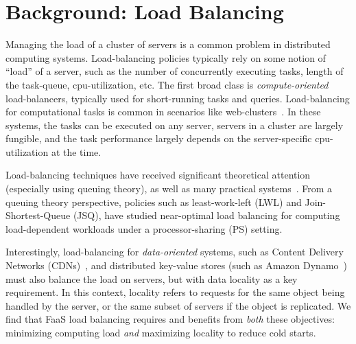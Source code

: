 \section{Background: Load Balancing}

Managing the load of a cluster of servers is a common problem in distributed computing systems.
Load-balancing policies typically rely on some notion of ``load'' of a server, such as the number of concurrently executing tasks, length of the task-queue, cpu-utilization, etc.
%
The first broad class is \emph{compute-oriented} load-balancers, typically used for short-running tasks and queries. 
Load-balancing for computational tasks is common in scenarios like web-clusters~\cite{karger1999web}. 
In these systems, the tasks can be executed on any server,  servers in a cluster are largely fungible, and the task performance largely depends on the server-specific cpu-utilization at the time.

Load-balancing techniques have received significant theoretical attention (especially using queuing theory), as well as many practical systems~\cite{decandia2007dynamo}. 
From a queuing theory perspective, policies such as least-work-left (LWL) and Join-Shortest-Queue (JSQ), have studied near-optimal load balancing for computing load-dependent workloads under a processor-sharing (PS) setting. 

Interestingly, load-balancing for \emph{data-oriented} systems, such as Content Delivery Networks (CDNs)~\cite{nygren2010akamai}, and distributed key-value stores (such as Amazon Dynamo~\cite{decandia2007dynamo}) must also balance the load on servers, but with data locality as a key requirement.
In this context, locality refers to requests for the same object being handled by the server, or the same subset of servers if the object is replicated. 
We find that FaaS load balancing requires and benefits from \emph{both} these objectives: minimizing computing load \emph{and} maximizing locality to reduce cold starts. 

